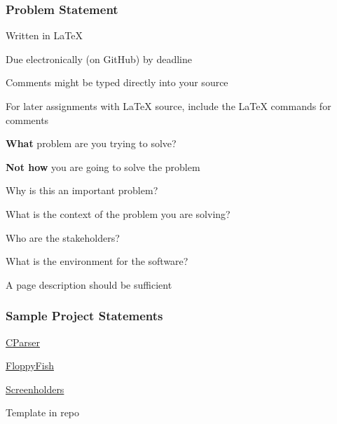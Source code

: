 \documentclass[t,12pt,numbers,fleqn]{beamer}
\begin{document}
\begin{frame}
\frametitle{Problem Statement}
\bi
\item Written in LaTeX
\item Due electronically (on GitHub) by deadline
\item Comments might be typed directly into your source
\item For later assignments with LaTeX source, include the LaTeX
  commands for comments
\item \textbf{What} problem are you trying to solve?
\item \textbf{Not how} you are going to solve the problem
\item Why is this an important problem?
\item What is the context of the problem you are solving? 
\bi
\item Who are the stakeholders?
\item What is the environment for the software?
\ei
\item A page description should be sufficient
\ei
\end{frame}


\begin{frame}
\frametitle{Sample Project Statements} 

\bi
\item \href{https://gitlab.cas.mcmaster.ca/ThisTooShallParse/3XA3_CParser}{CParser}
\item \href{https://gitlab.cas.mcmaster.ca/theateam/FloppyFishGroup}{FloppyFish}
\item
  \href{https://gitlab.cas.mcmaster.ca/screenholders/screenholders}{Screenholders}
\item Template in repo
\ei

\end{frame}

\end{document}
